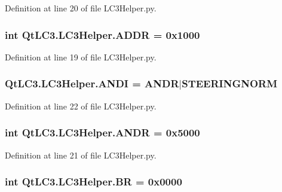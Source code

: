 Definition at line 20 of file L\-C3\-Helper.\-py.

\hypertarget{namespace_qt_l_c3_1_1_l_c3_helper_a2755d6265d2b3b158525ab68e253bc53}{
\subsubsection[{A\-D\-D\-R}]{\setlength{\rightskip}{0pt plus 5cm}int Qt\-L\-C3.\-L\-C3\-Helper.\-A\-D\-D\-R = 0x1000}}\label{namespace_qt_l_c3_1_1_l_c3_helper_a2755d6265d2b3b158525ab68e253bc53}


Definition at line 19 of file L\-C3\-Helper.\-py.

\hypertarget{namespace_qt_l_c3_1_1_l_c3_helper_a74183f176a3d37fb085953d31270977b}{
\subsubsection[{A\-N\-D\-I}]{\setlength{\rightskip}{0pt plus 5cm}Qt\-L\-C3.\-L\-C3\-Helper.\-A\-N\-D\-I = {\bf A\-N\-D\-R}$\vert${\bf S\-T\-E\-E\-R\-I\-N\-G\-N\-O\-R\-M}}}\label{namespace_qt_l_c3_1_1_l_c3_helper_a74183f176a3d37fb085953d31270977b}


Definition at line 22 of file L\-C3\-Helper.\-py.

\hypertarget{namespace_qt_l_c3_1_1_l_c3_helper_a708c0a74889a4ebe74b3b4aca5a689f0}{
\subsubsection[{A\-N\-D\-R}]{\setlength{\rightskip}{0pt plus 5cm}int Qt\-L\-C3.\-L\-C3\-Helper.\-A\-N\-D\-R = 0x5000}}\label{namespace_qt_l_c3_1_1_l_c3_helper_a708c0a74889a4ebe74b3b4aca5a689f0}


Definition at line 21 of file L\-C3\-Helper.\-py.

\hypertarget{namespace_qt_l_c3_1_1_l_c3_helper_a149ab214faca1440f8e8af5aaabbf655}{
\subsubsection[{B\-R}]{\setlength{\rightskip}{0pt plus 5cm}int Qt\-L\-C3.\-L\-C3\-Helper.\-B\-R = 0x0000}}\label{namespace_qt_l_c3_1_1_l_c3_helper_a149ab214faca1440f8e8af5aaabbf655}


